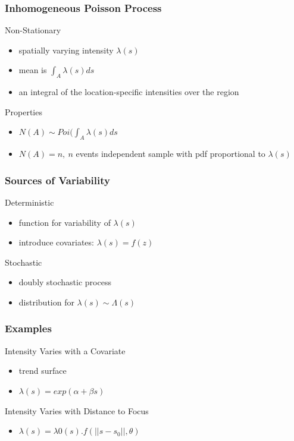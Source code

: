 \documentclass[nototal,handout]{beamer}
\begin{document}
 \begin{frame}
   \frametitle{Inhomogeneous Poisson Process}
   \begin{block}{Non-Stationary}
     \begin{itemize}
       \item spatially varying intensity $\lambda(s)$
       \item mean is $\int_A \lambda(s) ds$
       \item an integral of the location-specific intensities over the region
     \end{itemize}
    \end{block}
    \begin{block}{Properties}
      \begin{itemize}
	\item $N(A) \sim Poi(\int_A \lambda(s) ds$
	\item $N(A)=n, \ n$ events independent sample with pdf proportional to
	  $\lambda(s)$
      \end{itemize}
     \end{block}
  \end{frame}
  \begin{frame}
    \frametitle{Sources of Variability}
    \begin{block}{Deterministic}
      \begin{itemize}
	\item function for variability of $\lambda(s)$
	\item introduce covariates: $\lambda(s) = f(z)$
      \end{itemize}
     \end{block}
   \begin{block}{Stochastic}
      \begin{itemize}
	\item doubly stochastic process
	\item distribution for $\lambda(s) \sim \Lambda(s)$
      \end{itemize}
     \end{block}
\end{frame}

\begin{frame}
  \frametitle{Examples}
  \begin{block}{Intensity Varies with a Covariate}
    \begin{itemize}
      \item trend surface
      \item $\lambda(s) = exp(\alpha + \beta s)$
    \end{itemize}
  \end{block}
  \begin{block}{Intensity Varies with Distance to Focus}
    \begin{itemize}
      \item $\lambda(s) = \lambda 0(s). f( || s-s_0||, \theta)$
    \end{itemize}
  \end{block}
\end{frame}
\end{document}

